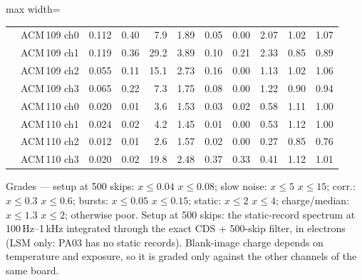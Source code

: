 \begin{table}[H]
\begin{adjustbox}{max width=\linewidth}
\begin{tabular}{llrrrrrrrrr}
 & ACM\,109 ch0 & \cellcolor{poor}0.112 & 0.40 & \cellcolor{fair}7.9 & 1.89 & \cellcolor{good}0.05 & \cellcolor{good}0.00 & \cellcolor{fair}2.07 & 1.02 & \cellcolor{good}1.07\\
 & ACM\,109 ch1 & \cellcolor{poor}0.119 & 0.36 & \cellcolor{poor}29.2 & 3.89 & \cellcolor{good}0.10 & \cellcolor{poor}0.21 & \cellcolor{fair}2.33 & 0.85 & \cellcolor{good}0.89\\
 & ACM\,109 ch2 & \cellcolor{fair}0.055 & 0.11 & \cellcolor{poor}15.1 & 2.73 & \cellcolor{good}0.16 & \cellcolor{good}0.00 & \cellcolor{good}1.13 & 1.02 & \cellcolor{good}1.06\\
 & ACM\,109 ch3 & \cellcolor{fair}0.065 & 0.22 & \cellcolor{fair}7.3 & 1.75 & \cellcolor{good}0.08 & \cellcolor{good}0.00 & \cellcolor{good}1.22 & 0.90 & \cellcolor{good}0.94\\
 & ACM\,110 ch0 & \cellcolor{good}0.020 & 0.01 & \cellcolor{good}3.6 & 1.53 & \cellcolor{good}0.03 & \cellcolor{good}0.02 & \cellcolor{good}0.58 & 1.11 & \cellcolor{good}1.00\\
 & ACM\,110 ch1 & \cellcolor{good}0.024 & 0.02 & \cellcolor{good}4.2 & 1.45 & \cellcolor{good}0.01 & \cellcolor{good}0.00 & \cellcolor{good}0.53 & 1.12 & \cellcolor{good}1.00\\
 & ACM\,110 ch2 & \cellcolor{good}0.012 & 0.01 & \cellcolor{good}2.6 & 1.57 & \cellcolor{good}0.02 & \cellcolor{good}0.00 & \cellcolor{good}0.27 & 0.85 & \cellcolor{good}0.76\\
 & ACM\,110 ch3 & \cellcolor{good}0.020 & 0.02 & \cellcolor{poor}19.8 & 2.48 & \cellcolor{fair}0.37 & \cellcolor{poor}0.33 & \cellcolor{good}0.41 & 1.12 & \cellcolor{good}1.01\\
\bottomrule\end{tabular}\end{adjustbox}
\par\smallskip\footnotesize Grades --- setup at 500 skips: \colorbox{good}{$x\le0.04$} \colorbox{fair}{$x\le0.08$}; slow noise: \colorbox{good}{$x\le5$} \colorbox{fair}{$x\le15$}; corr.: \colorbox{good}{$x\le0.3$} \colorbox{fair}{$x\le0.6$}; bursts: \colorbox{good}{$x\le0.05$} \colorbox{fair}{$x\le0.15$}; static: \colorbox{good}{$x\le2$} \colorbox{fair}{$x\le4$}; charge/median: \colorbox{good}{$x\le1.3$} \colorbox{fair}{$x\le2$}; otherwise \colorbox{poor}{poor}. Setup at 500 skips: the static-record spectrum at 100\,Hz--1\,kHz integrated through the exact CDS + 500-skip filter, in electrons (LSM only: PA03 has no static records). Blank-image charge depends on temperature and exposure, so it is graded only against the other channels of the same board.
\end{table}

